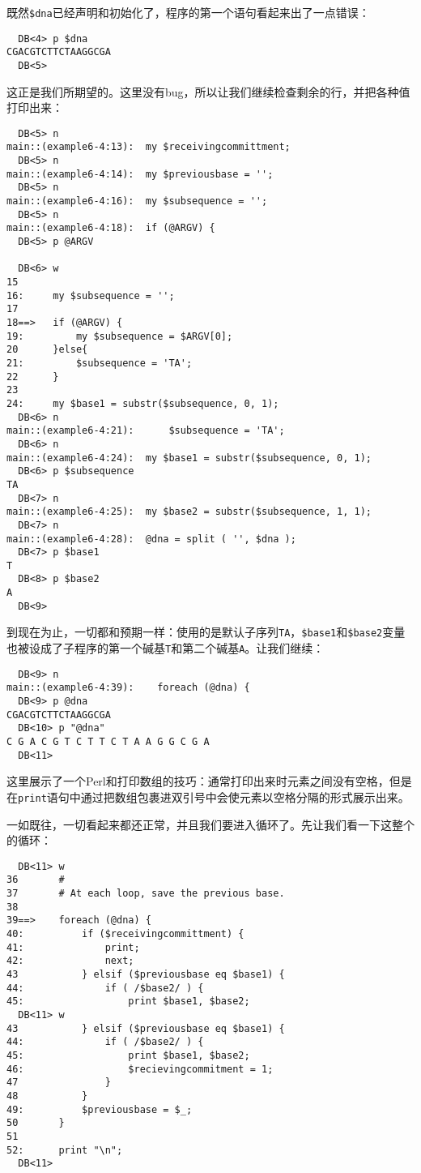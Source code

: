 既然\verb|$dna|已经声明和初始化了，程序的第一个语句看起来出了一点错误：

\begin{lstlisting}
  DB<4> p $dna
CGACGTCTTCTAAGGCGA
  DB<5> 
\end{lstlisting}

这正是我们所期望的。这里没有bug，所以让我们继续检查剩余的行，并把各种值打印出来：

\begin{lstlisting}
  DB<5> n
main::(example6-4:13):	my $receivingcommittment;
  DB<5> n
main::(example6-4:14):	my $previousbase = ''; 
  DB<5> n
main::(example6-4:16):	my $subsequence = '';
  DB<5> n
main::(example6-4:18):	if (@ARGV) {
  DB<5> p @ARGV

  DB<6> w
15
16:     my $subsequence = '';
17
18==>   if (@ARGV) {
19:         my $subsequence = $ARGV[0];
20      }else{
21:         $subsequence = 'TA';
22      }
23
24:     my $base1 = substr($subsequence, 0, 1);
  DB<6> n
main::(example6-4:21):	    $subsequence = 'TA';
  DB<6> n
main::(example6-4:24):	my $base1 = substr($subsequence, 0, 1);
  DB<6> p $subsequence
TA
  DB<7> n
main::(example6-4:25):	my $base2 = substr($subsequence, 1, 1);
  DB<7> n
main::(example6-4:28):	@dna = split ( '', $dna );
  DB<7> p $base1
T
  DB<8> p $base2
A
  DB<9>
\end{lstlisting}

到现在为止，一切都和预期一样：使用的是默认子序列\verb|TA|，\verb|$base1|和\verb|$base2|变量也被设成了子程序的第一个碱基\verb|T|和第二个碱基\verb|A|。让我们继续：

\begin{lstlisting}
  DB<9> n
main::(example6-4:39):    foreach (@dna) {
  DB<9> p @dna
CGACGTCTTCTAAGGCGA
  DB<10> p "@dna"
C G A C G T C T T C T A A G G C G A
  DB<11> 
\end{lstlisting}

这里展示了一个Perl和打印数组的技巧：通常打印出来时元素之间没有空格，但是在\verb|print|语句中通过把数组包裹进双引号中会使元素以空格分隔的形式展示出来。

一如既往，一切看起来都还正常，并且我们要进入循环了。先让我们看一下这整个的循环：

\begin{lstlisting}
  DB<11> w
36       #
37       # At each loop, save the previous base.
38
39==>    foreach (@dna) {
40:          if ($receivingcommittment) {
41:              print;
42:              next;
43           } elsif ($previousbase eq $base1) {
44:              if ( /$base2/ ) {
45:                  print $base1, $base2; 
  DB<11> w
43           } elsif ($previousbase eq $base1) {
44:              if ( /$base2/ ) {
45:                  print $base1, $base2; 
46:                  $recievingcommitment = 1;
47               }
48           }
49:          $previousbase = $_;
50       }
51
52:      print "\n";
  DB<11>
\end{lstlisting}

